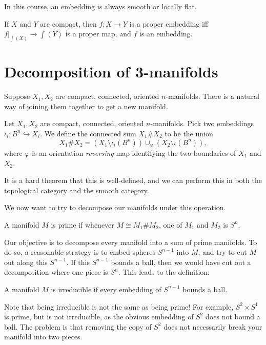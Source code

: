 \documentclass[a4paper]{article}
\begin{document}
In this course, an embedding is always smooth or locally flat.

\begin{thm}
  If $X$ and $Y$ are compact, then $f: X \to Y$ is a proper embedding iff $f|_{\int(X)} \to \int(Y)$ is a proper map, and $f$ is an embedding.
\end{thm}

\section{Decomposition of 3-manifolds}
Suppose $X_1, X_2$ are compact, connected, oriented $n$-manifolds. There is a natural way of joining them together to get a new manifold.
\begin{defi}
  Let $X_1, X_2$ are compact, connected, oriented $n$-manifolds. Pick two embeddings $\iota_i; B^n \hookrightarrow X_i$. We define the connected sum $X_1 \# X_2$ to be the union
  \[
    X_1 \# X_2 = (X_1 \setminus \iota_i(B^n)) \cup_\varphi(X_2 \setminus \iota(B^n)),
  \]
  where $\varphi$ is an orientation \emph{reversing} map identifying the two boundaries of $X_1$ and $X_2$.
\end{defi}

It is a hard theorem that this is well-defined, and we can perform this in both the topological category and the smooth category.

We now want to try to decompose our manifolds under this operation.
\begin{defi}
  A manifold $M$ is prime if whenever $M \cong M_1 \# M_2$, one of $M_1$ and $M_2$ is $S^n$.
\end{defi}

Our objective is to decompose every manifold into a sum of prime manifolds. To do so, a reasonable strategy is to embed spheres $S^{n - 1}$ into $M$, and try to cut $M$ out along this $S^{n - 1}$. If this $S^{n - 1}$ bounds a ball, then we would have cut out a decomposition where one piece is $S^n$. This leads to the definition:
\begin{defi}
  A manifold $M$ is irreducible if every embedding of $S^{n - 1}$ bounds a ball.
\end{defi}

Note that being irreducible is not the same as being prime! For example, $S^2 \times S^1$ is prime, but is not irreducible, as the obvious embedding of $S^2$ does not bound a ball. The problem is that removing the copy of $S^2$ does not necessarily break your manifold into two pieces.
\end{document}
